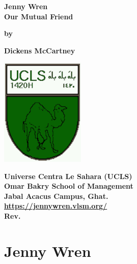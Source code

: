 \documentclass[12pt]{book}
\newcommand{\pengarangs}{%
    Dickens McCartney\\
}
\newcommand{\judul}{%
Jenny Wren\\[13pt]
Our Mutual Friend
}
\begin{document}
\begin{titlepage}
    \begin{center}    

    \vspace*{15mm}
    \textbf{\Large \judul}

    \vspace*{30mm}       
    \textbf{by}

    \vspace*{15mm}    
    \textbf{\Large \pengarangs}

    \vspace*{4.0cm}

    \begin{center}
        \includegraphics[width=40mm]{ucls-coat}
    \end{center}

    \textbf{
       Universe Centra Le Sahara (UCLS)\\[10pt]
       Omar Bakry School of Management\\[10pt]
       Jabal Acacus Campus, Ghat. \\[10pt]
       \url{https://jennywren.vlsm.org/} \\[10pt]
       Rev. \rev%
    }


    \end{center}

\end{titlepage}


\tableofcontents

\newpage

\chapter*{Jenny Wren}
\end{document}
